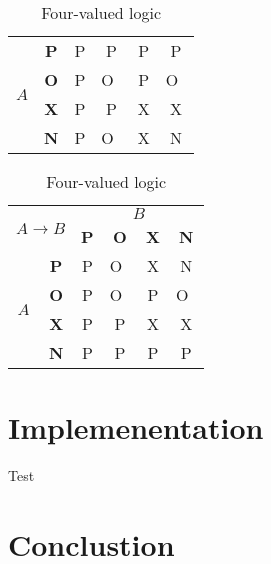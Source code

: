 \documentclass[11pt, a4paper]{article}
\begin{document}
\begin{table}[ht]
\begin{tabular}[ht]{|c|c|c|c|c|c|}
            \multirow{4}{*}{$A$} & \textbf{P} & P & P & P & P \\ \cline{2-6}
            & \textbf{O} & P & O~& P & O~\\ \cline{2-6}
            & \textbf{X} & P & P & X & X \\ \cline{2-6}
            & \textbf{N} & P & O~& X & N \\ \hline
        \end{tabular}
        \begin{tabular}[ht]{|c|c|c|c|c|c|}
        	\hline
            \multicolumn{2}{|c|}{\multirow{2}{*}{$A \rightarrow B$}} & \multicolumn{4}{c|}{$B$} \\ \cline{3-6}
             \multicolumn{2}{|c|}{} & \textbf{P} & \textbf{O} & \textbf{X} & \textbf{N} \\ \hline
            \multirow{4}{*}{$A$} & \textbf{P} & P & O~& X & N \\ \cline{2-6}
            & \textbf{O} & P & O~& P & O~\\ \cline{2-6}
            & \textbf{X} & P & P & X & X \\ \cline{2-6}
            & \textbf{N} & P & P & P & P \\ \hline
        \end{tabular}
        \caption{Four-valued logic}
        \label{tab:logic}
    \end{table}

    \section{Implemenentation}
    \label{sec:Implementation}

      Test \cite{example}

    \section{Conclustion}
    \label{sec:Conclusion}

  
  
\end{document}
